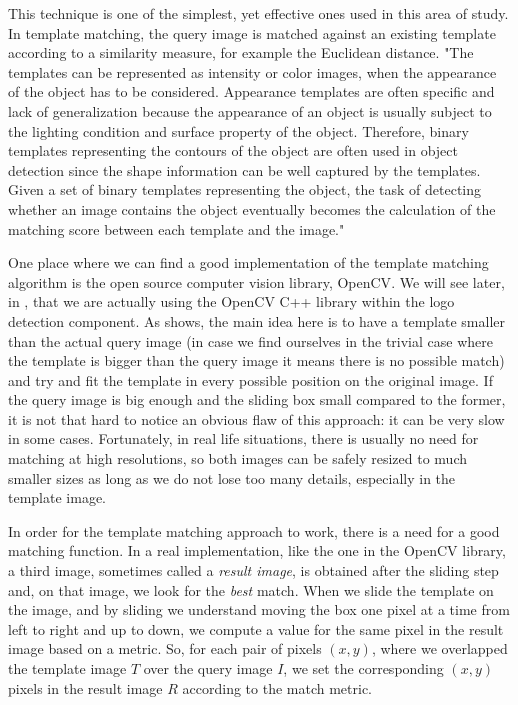 This technique is one of the simplest, yet effective ones used in this area of
study. In template matching, the query image is matched against an existing
template according to a similarity measure, for example the Euclidean
distance. "The templates can be represented as intensity or color images, when the
appearance of the object has to be considered. Appearance templates are often
specific and lack of generalization because the appearance of an object is
usually subject to the lighting condition and surface property of the object.
Therefore, binary templates representing the contours of the object are often
used in object detection since the shape information can be well captured by
the templates. Given a set of binary templates representing the object, the
task of detecting whether an image contains the object eventually becomes the
calculation of the matching score between each template and the
image."\cite{improved-template}

One place where we can find a good implementation of the template matching
algorithm is the open source computer vision library, OpenCV\cite{open-cv}.
We will see later, in , that we
are actually using the OpenCV C++ library within the logo detection component. As
 shows, the main idea here is to
have a template smaller than the actual query image (in case we find ourselves
in the trivial case where the template is bigger than the query image it means
there is no possible match) and try and fit the template in every possible
position on the original image. If the query image is big enough and the
sliding box small compared to the former, it is not that hard to notice an
obvious flaw of this approach: it can be very slow in some cases. Fortunately,
in real life situations, there is usually no need for matching at high
resolutions, so both images can be safely resized to much smaller sizes as
long as we do not lose too many details, especially in the template image.


In order for the template matching approach to work, there is a need for a
good matching function. In a real implementation, like the one in the OpenCV
library, a third image, sometimes called a \textit{result image}, is obtained
after the sliding step and, on that image, we look for the \textit{best} match.
When we slide the template on the image, and by sliding we understand moving
the box one pixel at a time from left to right and up to down, we compute a
value for the same pixel in the result image based on a metric. So, for each
pair of pixels \((x, y)\), where we overlapped the template image \(T\) over
the query image \(I\), we set the corresponding \((x, y)\) pixels in the result
image \(R\) according to the match metric.

